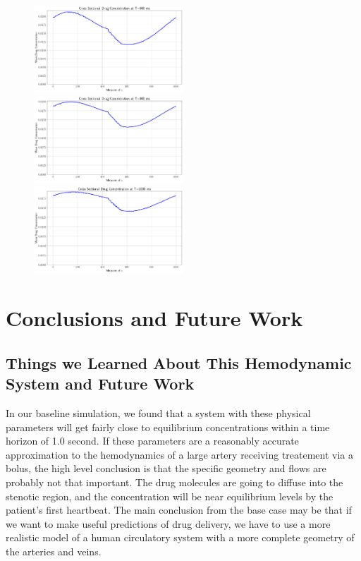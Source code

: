 \documentclass[11pt]{article} %
\begin{document}
\begin{figure}
\includegraphics[width=0.50\textwidth]{drug_profile/drug_profile_t_600.png}\\[0.25in]
\hspace*{-0.25in}
\includegraphics[width=0.50\textwidth]{drug_profile/drug_profile_t_800.png}
\includegraphics[width=0.50\textwidth]{drug_profile/drug_profile_t_1000.png}
\end{figure}

\newpage
\section{Conclusions and Future Work}
\subsection{Things we Learned About This Hemodynamic System and Future Work}
In our baseline simulation, we found that a system with these physical
parameters will get fairly close to equilibrium concentrations within a time horizon of 1.0 second.  
If these parameters are a reasonably accurate approximation to the hemodynamics of a large
artery receiving treatement via a bolus, the high level conclusion is that the specific geometry
and flows are probably not that important.  
The drug molecules are going to diffuse into the stenotic region, and the concentration will
be near equilibrium levels by the patient's first heartbeat.
The main conclusion from the base case may be that if we want to make useful predictions
of drug delivery, we have to use a more realistic model of a human circulatory system
with a more complete geometry of the arteries and veins.
\end{document}

